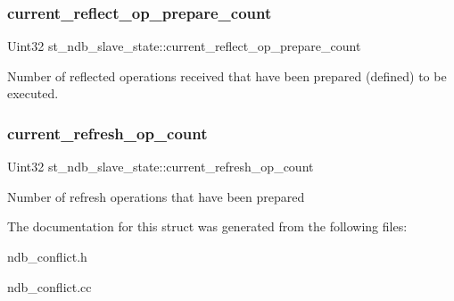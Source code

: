 \subsubsection{\texorpdfstring{current\+\_\+reflect\+\_\+op\+\_\+prepare\+\_\+count}{current\_reflect\_op\_prepare\_count}}
{\footnotesize\ttfamily Uint32 st\+\_\+ndb\+\_\+slave\+\_\+state\+::current\+\_\+reflect\+\_\+op\+\_\+prepare\+\_\+count}

Number of reflected operations received that have been prepared (defined) to be executed. \mbox{\label{structst__ndb__slave__state_a03e38b1dcbe407f62fff243162a1042b}} 
\subsubsection{\texorpdfstring{current\+\_\+refresh\+\_\+op\+\_\+count}{current\_refresh\_op\_count}}
{\footnotesize\ttfamily Uint32 st\+\_\+ndb\+\_\+slave\+\_\+state\+::current\+\_\+refresh\+\_\+op\+\_\+count}

Number of refresh operations that have been prepared 

The documentation for this struct was generated from the following files\+:\begin{DoxyCompactItemize}
\item 
ndb\+\_\+conflict.\+h\item 
ndb\+\_\+conflict.\+cc\end{DoxyCompactItemize}
